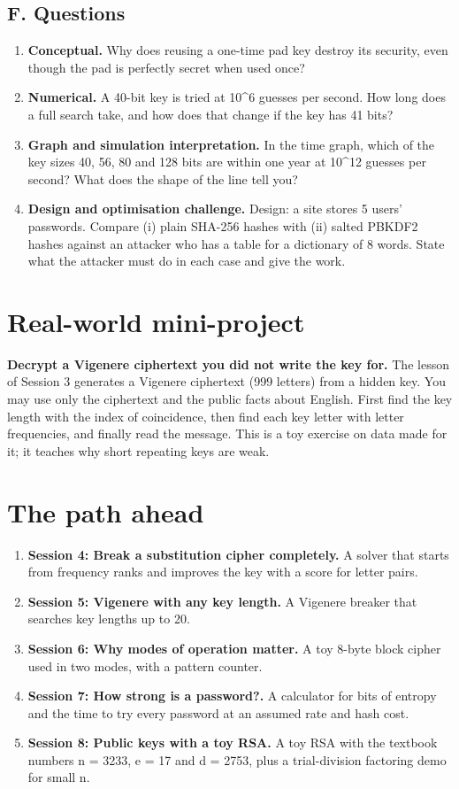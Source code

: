\documentclass[11pt,a4paper]{article}
\begin{document}
\subsection*{F. Questions}
\begin{enumerate}[nosep]
\item \textbf{Conceptual.} Why does reusing a one-time pad key destroy its security, even though the pad is perfectly secret when used once?
\item \textbf{Numerical.} A 40-bit key is tried at 10\textasciicircum{}6 guesses per second. How long does a full search take, and how does that change if the key has 41 bits?
\item \textbf{Graph and simulation interpretation.} In the time graph, which of the key sizes 40, 56, 80 and 128 bits are within one year at 10\textasciicircum{}12 guesses per second? What does the shape of the line tell you?
\item \textbf{Design and optimisation challenge.} Design: a site stores 5 users' passwords. Compare (i) plain SHA-256 hashes with (ii) salted PBKDF2 hashes against an attacker who has a table for a dictionary of 8 words. State what the attacker must do in each case and give the work.
\end{enumerate}

\section{Real-world mini-project}
\textbf{Decrypt a Vigenere ciphertext you did not write the key for.} The lesson of Session 3 generates a Vigenere ciphertext (999 letters) from a hidden key. You may use only the ciphertext and the public facts about English. First find the key length with the index of coincidence, then find each key letter with letter frequencies, and finally read the message. This is a toy exercise on data made for it; it teaches why short repeating keys are weak.

\section{The path ahead}
\begin{enumerate}[nosep]
\item \textbf{Session 4: Break a substitution cipher completely.} A solver that starts from frequency ranks and improves the key with a score for letter pairs.
\item \textbf{Session 5: Vigenere with any key length.} A Vigenere breaker that searches key lengths up to 20.
\item \textbf{Session 6: Why modes of operation matter.} A toy 8-byte block cipher used in two modes, with a pattern counter.
\item \textbf{Session 7: How strong is a password?.} A calculator for bits of entropy and the time to try every password at an assumed rate and hash cost.
\item \textbf{Session 8: Public keys with a toy RSA.} A toy RSA with the textbook numbers n = 3233, e = 17 and d = 2753, plus a trial-division factoring demo for small n.
\end{enumerate}
\end{document}
